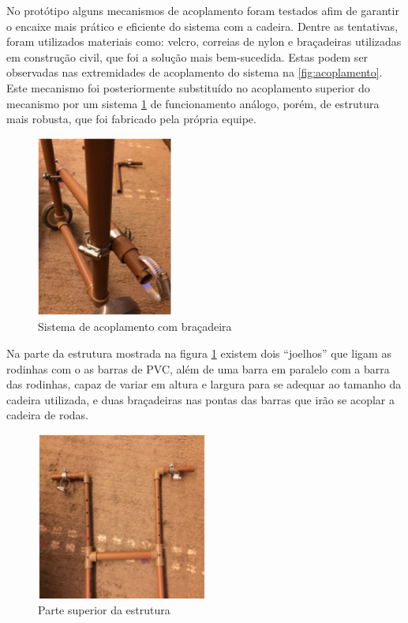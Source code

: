 No protótipo alguns mecanismos de acoplamento foram testados afim de garantir o encaixe mais prático e eficiente do sistema com a cadeira. Dentre as tentativas, foram utilizados materiais como: velcro, correias de nylon e braçadeiras utilizadas em construção civil, que foi a solução mais bem-sucedida. Estas podem ser observadas nas extremidades de acoplamento do sistema na \ref{fig:acoplamento}. Este mecanismo foi posteriormente substituído no acoplamento superior do mecanismo por um sistema  \ref{fig:acop_bracadeira} de funcionamento análogo, porém, de estrutura mais robusta, que foi fabricado pela própria equipe.

\begin{figure}[!htb]
\centering
\includegraphics[width=0.4\textwidth]{figuras/resultados/acop_bracadeira}
\caption{Sistema de acoplamento com braçadeira}
\label{fig:acop_bracadeira}
\end{figure}

Na parte da estrutura mostrada na figura \ref{fig:acop_bracadeira} existem dois “joelhos” que ligam as rodinhas com o as barras de PVC, além de uma barra em paralelo com a barra das rodinhas, capaz de variar em altura e largura para se adequar ao tamanho da cadeira utilizada, e  duas braçadeiras nas pontas das barras que irão se acoplar a cadeira de rodas.

\begin{figure}[!htb]
\centering
\includegraphics[width=0.5\textwidth]{figuras/resultados/superior_estrutura}
\caption{Parte superior da estrutura}
\label{fig:superior_estrutura}
\end{figure}

